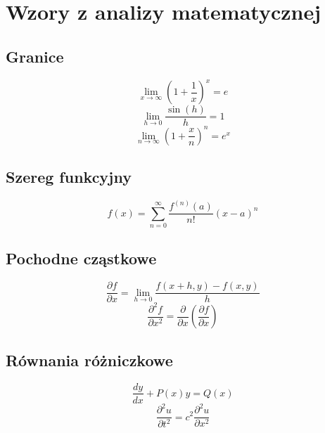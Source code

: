 \documentclass{article}
\begin{document}
\section*{Wzory z analizy matematycznej}

\subsection*{Granice}

\[
    \lim_{x \to \infty} \left(1 + \frac{1}{x}\right)^x = e
\]
\[
    \lim_{h \to 0} \frac{\sin(h)}{h} = 1
\]
\[
    \lim_{n \to \infty} \left(1 + \frac{x}{n}\right)^n = e^x
\]

\subsection*{Szereg funkcyjny}

\[
    f(x) = \sum_{n=0}^{\infty} \frac{f^{(n)}(a)}{n!}(x-a)^n
\]

\subsection*{Pochodne cząstkowe}

\[
    \frac{\partial f}{\partial x} = \lim_{h \to 0} \frac{f(x+h, y) - f(x, y)}{h}
\]
\[
    \frac{\partial^2 f}{\partial x^2} = \frac{\partial}{\partial x}\left(\frac{\partial f}{\partial x}\right)
\]

\subsection*{Równania różniczkowe}

\[
    \frac{dy}{dx} + P(x)y = Q(x)
\]
\[
    \frac{\partial^2 u}{\partial t^2} = c^2 \frac{\partial^2 u}{\partial x^2}
\]
\end{document}
